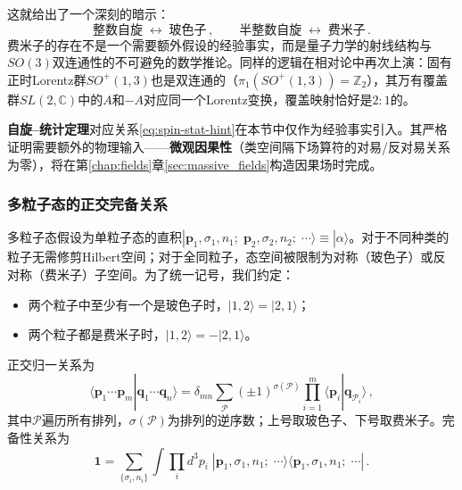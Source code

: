 这就给出了一个深刻的暗示：
\begin{equation}\label{eq:spin-stat-hint}
\text{整数自旋} \;\longleftrightarrow\; \text{玻色子}\,,\qquad
\text{半整数自旋} \;\longleftrightarrow\; \text{费米子}\,.
\end{equation}
费米子的存在不是一个需要额外假设的经验事实，而是量子力学的射线结构与$SO(3)$双连通性的不可避免的数学推论。同样的逻辑在相对论中再次上演：固有正时Lorentz群$SO^+(1,3)$也是双连通的（$\pi_1(SO^+(1,3))=\mathbb{Z}_2$），其万有覆盖群$SL(2,\mathbb{C})$中的$A$和$-A$对应同一个Lorentz变换，覆盖映射恰好是$2{:}1$的。

\begin{tcolorbox}[colback=white, colframe=black!45]
\textbf{自旋--统计定理}\quad 对应关系\eqref{eq:spin-stat-hint}在本节中仅作为经验事实引入。其严格证明需要额外的物理输入——\textbf{微观因果性}（类空间隔下场算符的对易/反对易关系为零），将在第\ref{chap:fields}章\ref{sec:massive_fields}构造因果场时完成。
\end{tcolorbox}

\subsubsection*{多粒子态的正交完备关系}

多粒子态假设为单粒子态的直积$|\boldsymbol{p}_1,\sigma_1,n_1;\;\boldsymbol{p}_2,\sigma_2,n_2;\;\cdots\rangle\equiv|\alpha\rangle$。对于不同种类的粒子无需修剪Hilbert空间；对于全同粒子，态空间被限制为对称（玻色子）或反对称（费米子）子空间。为了统一记号，我们约定：
\begin{itemize}
\item 两个粒子中至少有一个是玻色子时，$|1,2\rangle=|2,1\rangle$；
\item 两个粒子都是费米子时，$|1,2\rangle=-|2,1\rangle$。
\end{itemize}

正交归一关系为
\begin{equation}\label{eq:multinorm}
\langle\boldsymbol{p}_1\cdots\boldsymbol{p}_m|\boldsymbol{q}_1\cdots\boldsymbol{q}_n\rangle
= \delta_{mn}\sum_{\mathscr{P}} (\pm 1)^{\sigma(\mathscr{P})}
  \prod_{i=1}^{m}\langle\boldsymbol{p}_i|\boldsymbol{q}_{\mathscr{P}_i}\rangle\,,
\end{equation}
其中$\mathscr{P}$遍历所有排列，$\sigma(\mathscr{P})$为排列的逆序数；上号取玻色子、下号取费米子。完备性关系为
\begin{equation}\label{eq:multicomp}
\mathbf{1} = \sum_{\{\sigma_i,n_i\}}\int\prod_i d^3p_i\;
|\boldsymbol{p}_1,\sigma_1,n_1;\;\cdots\rangle
\langle\boldsymbol{p}_1,\sigma_1,n_1;\;\cdots|\,.
\end{equation}

